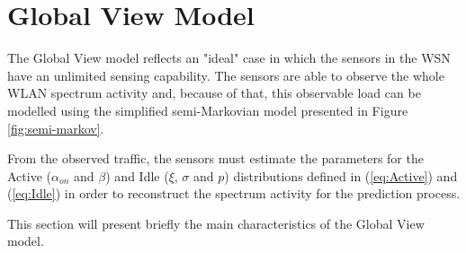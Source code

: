 \section{Global View Model} \label{sec:global_view_model}
The Global View model reflects an "ideal" case in which the sensors in the \acs{WSN} have an unlimited sensing capability. The sensors are able to observe the whole \acs{WLAN} spectrum activity and, because of that, this observable load can be modelled using the simplified semi-Markovian model presented in Figure \ref{fig:semi-markov}.

From the observed traffic, the sensors must estimate the parameters for the Active ($\alpha_{on}$ and $\beta$) and Idle ($\xi$, $\sigma$  and ${p}$) distributions defined in (\ref{eq:Active}) and (\ref{eq:Idle}) in order to reconstruct the spectrum activity for the prediction process.

This section will present briefly the main characteristics of the Global View model.
